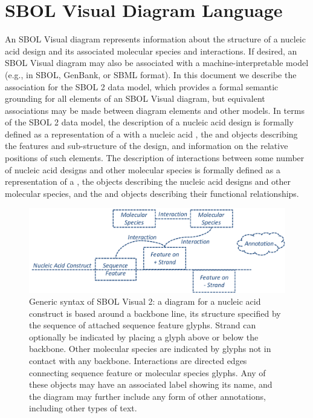 \section{SBOL Visual Diagram Language}
\label{sec:language}

An SBOL Visual diagram represents information about the structure of a nucleic acid design and its associated molecular species and interactions.
%
If desired, an SBOL Visual diagram may also be associated with a machine-interpretable model (e.g., in SBOL, GenBank, or SBML format).
In this document we describe the association for the SBOL 2 data model, which provides a formal semantic grounding for all elements of an SBOL Visual diagram, but equivalent associations may be made between diagram elements and other models.
%
In terms of the SBOL 2 data model, the description of a nucleic acid design is formally defined as a representation of a  with a nucleic acid , the  and  objects describing the features and sub-structure of the design, and  information on the relative positions of such elements.
%
The description of interactions between some number of nucleic acid designs and other molecular species is formally defined as a representation of a , the  objects describing the nucleic acid designs and other molecular species, and the  and  objects describing their functional relationships.

\begin{figure}[h!]
\centering
\includegraphics[width=6in]{figures/SBOLsyntax.pdf}
\caption{Generic syntax of SBOL Visual 2:  
a diagram for a nucleic acid construct is based around a backbone line, its structure specified by the sequence of attached sequence feature glyphs.  
Strand can optionally be indicated by placing a glyph above or below the backbone.  
Other molecular species are indicated by glyphs not in contact with any backbone.
Interactions are directed edges connecting sequence feature or molecular species glyphs.
Any of these objects may have an associated label showing its name, and the diagram may further include any form of other annotations, including other types of text.}
\label{f:syntax}
\end{figure}

